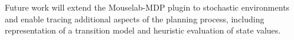 \documentclass[11pt]{article} %
\begin{document}
Future work will extend the Mouselab-MDP plugin to stochastic environments and enable tracing additional aspects of the planning process, including representation of a transition model and heuristic evaluation of state values.





\renewcommand{\bibliographytypesize}{\small}
\setlength{\bibleftmargin}{.05in}
\setlength{\bibindent}{-\bibleftmargin}

\end{document}
